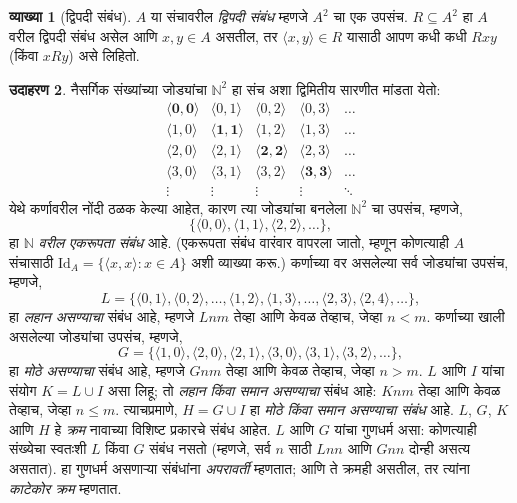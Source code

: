 \documentclass[11pt,a4paper,openany]{book}
\theoremstyle{definition}
\newtheorem{defn}{व्याख्या}[section]
\newtheorem{ex}[defn]{उदाहरण}
\newcommand{\Setabs}[2]{\{#1:#2\}}
\newcommand{\tuple}[1]{\langle #1\rangle}
\newcommand{\Nat}{\mathbb{N}}
\newcommand{\Id}[1]{\mathord{\mathrm{Id}_{#1}}}
\begin{document}
\begin{defn}[द्विपदी संबंध]
$A$ या संचावरील \emph{द्विपदी संबंध} म्हणजे $A^{2}$ चा एक उपसंच.
$R \subseteq A^{2}$ हा $A$ वरील द्विपदी संबंध असेल आणि $x, y \in A$
असतील, तर $\tuple{x, y} \in R$ यासाठी आपण कधी कधी $Rxy$ (किंवा $xRy$)
असे लिहितो.
\end{defn}

\begin{ex}
  \label{sfr:rel:set:relations}
नैसर्गिक संख्यांच्या जोड्यांचा $\Nat^{2}$ हा संच अशा द्विमितीय सारणीत
मांडता येतो:
\[
  \begin{array}{ccccc}
  \mathbf{\tuple{ 0,0 }} & \tuple{ 0,1 } &
    \tuple{ 0,2 } & \tuple{ 0,3 } & \ldots\\
  \tuple{ 1,0 } & \mathbf{\tuple{ 1,1 }} &
    \tuple{ 1,2 } & \tuple{ 1,3 } & \ldots\\
  \tuple{ 2,0 } & \tuple{ 2,1 } &
    \mathbf{\tuple{ 2,2 }} & \tuple{ 2,3 } & \ldots\\
  \tuple{ 3,0 } & \tuple{ 3,1 } & \tuple{ 3,2 } &
    \mathbf{\tuple{ 3,3 }} & \ldots\\
  \vdots & \vdots & \vdots & \vdots & \mathbf{\ddots}
  \end{array}
\]
येथे कर्णावरील नोंदी ठळक केल्या आहेत, कारण त्या जोड्यांचा बनलेला
$\Nat^2$ चा उपसंच, म्हणजे,
\[
  \{\tuple{0,0 }, \tuple{ 1,1 }, \tuple{ 2,2 }, \dots\},
  \]
हा \emph{$\Nat$ वरील एकरूपता संबंध} आहे. (एकरूपता संबंध वारंवार वापरला
जातो, म्हणून कोणत्याही $A$ संचासाठी $\Id{A}=\Setabs{\tuple{ x,x }}{x \in
A}$ अशी व्याख्या करू.) कर्णाच्या वर असलेल्या सर्व जोड्यांचा उपसंच, म्हणजे,
\[
  L = \{\tuple{ 0,1 },\tuple{ 0,2 },\ldots,\tuple{ 1,2 },
  \tuple{ 1,3 }, \dots, \tuple{ 2,3 },\tuple{ 2,4 },\ldots\},
\]
हा \emph{लहान असण्याचा} संबंध आहे, म्हणजे $Lnm$ तेव्हा आणि केवळ तेव्हाच,
जेव्हा $n<m$. कर्णाच्या खाली असलेल्या जोड्यांचा उपसंच, म्हणजे,
\[
  G=\{ \tuple{ 1,0 },\tuple{ 2,0 },\tuple{
    2,1 }, \tuple{ 3,0 },\tuple{ 3,1 },\tuple{ 3,2 }, \dots\},
\]
हा \emph{मोठे असण्याचा} संबंध आहे, म्हणजे $Gnm$ तेव्हा आणि केवळ तेव्हाच,
जेव्हा $n>m$. $L$ आणि $I$ यांचा संयोग $K=L\cup I$ असा लिहू; तो
\emph{लहान किंवा समान असण्याचा} संबंध आहे: $Knm$ तेव्हा आणि केवळ तेव्हाच,
जेव्हा $n \le m$. त्याचप्रमाणे, $H=G \cup I$ हा \emph{मोठे किंवा समान
असण्याचा संबंध} आहे. $L$, $G$, $K$ आणि $H$ हे \emph{क्रम} नावाच्या
विशिष्ट प्रकारचे संबंध आहेत. $L$ आणि $G$ यांचा गुणधर्म असा: कोणत्याही संख्येचा स्वतःशी $L$ किंवा $G$
संबंध नसतो (म्हणजे, सर्व $n$ साठी $Lnn$ आणि $Gnn$ दोन्ही असत्य असतात).
हा गुणधर्म असणाऱ्या संबंधांना \emph{अपरावर्ती} म्हणतात; आणि ते क्रमही
असतील, तर त्यांना \emph{काटेकोर क्रम} म्हणतात.
\end{ex}
\end{document}
